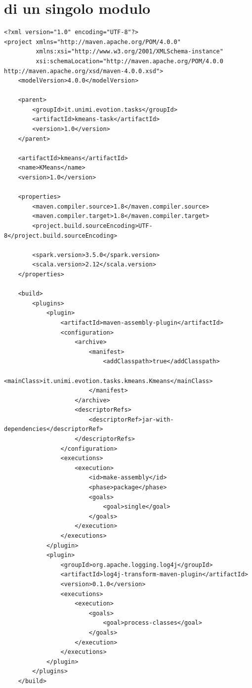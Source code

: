 \documentclass[12pt,a4paper,fleqn,titlepage]{report}
\begin{document}
\chapter{ di un singolo modulo}\label{apx:module_pom}
\begin{lstlisting}
<?xml version="1.0" encoding="UTF-8"?>
<project xmlns="http://maven.apache.org/POM/4.0.0"
         xmlns:xsi="http://www.w3.org/2001/XMLSchema-instance"
         xsi:schemaLocation="http://maven.apache.org/POM/4.0.0 http://maven.apache.org/xsd/maven-4.0.0.xsd">
    <modelVersion>4.0.0</modelVersion>

    <parent>
        <groupId>it.unimi.evotion.tasks</groupId>
        <artifactId>kmeans-task</artifactId>
        <version>1.0</version>
    </parent>

    <artifactId>kmeans</artifactId>
    <name>KMeans</name>
    <version>1.0</version>

    <properties>
        <maven.compiler.source>1.8</maven.compiler.source>
        <maven.compiler.target>1.8</maven.compiler.target>
        <project.build.sourceEncoding>UTF-8</project.build.sourceEncoding>

        <spark.version>3.5.0</spark.version>
        <scala.version>2.12</scala.version>
    </properties>

    <build>
        <plugins>
            <plugin>
                <artifactId>maven-assembly-plugin</artifactId>
                <configuration>
                    <archive>
                        <manifest>
                            <addClasspath>true</addClasspath>
                            <mainClass>it.unimi.evotion.tasks.kmeans.Kmeans</mainClass>
                        </manifest>
                    </archive>
                    <descriptorRefs>
                        <descriptorRef>jar-with-dependencies</descriptorRef>
                    </descriptorRefs>
                </configuration>
                <executions>
                    <execution>
                        <id>make-assembly</id>
                        <phase>package</phase>
                        <goals>
                            <goal>single</goal>
                        </goals>
                    </execution>
                </executions>
            </plugin>
            <plugin>
                <groupId>org.apache.logging.log4j</groupId>
                <artifactId>log4j-transform-maven-plugin</artifactId>
                <version>0.1.0</version>
                <executions>
                    <execution>
                        <goals>
                            <goal>process-classes</goal>
                        </goals>
                    </execution>
                </executions>
            </plugin>
        </plugins>
    </build>


\end{lstlisting}
\end{document}
